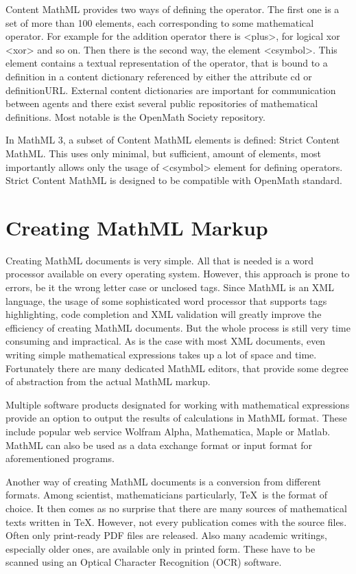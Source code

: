 \documentclass[11pt,oneside,final]{fithesis2}
\begin{document}
Content MathML provides two ways of defining the operator. The first one is a set of more than 100 elements, each corresponding to some mathematical operator. For example for the addition operator there is <plus>, for logical xor <xor> and so on. Then there is the second way, the element <csymbol>. This element contains a textual representation of the operator, that is bound to a definition in a content dictionary referenced by either the attribute cd or definitionURL. External content dictionaries are important for communication between agents and there exist several public repositories of mathematical definitions. Most notable is the OpenMath Society repository.

In MathML 3, a subset of Content MathML elements is defined: Strict Content MathML. This uses only minimal, but sufficient, amount of elements, most importantly allows only the usage of <csymbol> element for defining operators. Strict Content MathML is designed to be compatible with OpenMath standard.

\section{Creating MathML Markup}
\label{sec:create-mathml}
Creating MathML documents is very simple. All that is needed is a word processor available on every operating system. However, this approach is prone to errors, be it the wrong letter case or unclosed tags. Since MathML is an XML language, the usage of some sophisticated word processor that supports tags highlighting, code completion and XML validation will greatly improve the efficiency of creating MathML documents. But the whole process is still very time consuming and impractical. As is the case with most XML documents, even writing simple mathematical expressions takes up a lot of space and time. Fortunately there are many dedicated MathML editors, that provide some degree of abstraction from the actual MathML markup.

Multiple software products designated for working with mathematical expressions provide an option to output the results of calculations in MathML format. These include popular web service Wolfram Alpha, Mathematica, Maple or Matlab. MathML can also be used as a data exchange format or input format for aforementioned programs.

Another way of creating MathML documents is a conversion from different formats. Among scientist, mathematicians particularly, \TeX\ is the format of choice. It then comes as no surprise that there are many sources of mathematical texts written in \TeX. However, not every publication comes with the source files. Often only print-ready PDF files are released. Also many academic writings, especially older ones, are available only in printed form. These have to be scanned using an Optical Character Recognition (OCR) software. 
\end{document}

